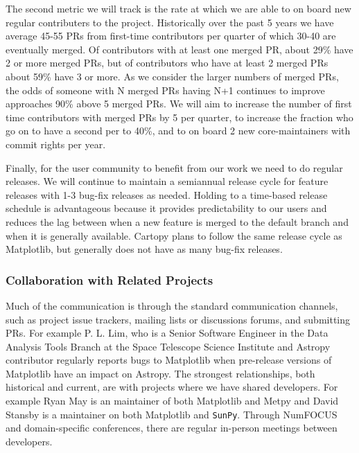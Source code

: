 \documentclass[12pt]{article}
\numberwithin{page}{section}
\begin{document}
The second metric we will track is the rate at which we are able to on board
new regular contributers to the project.  Historically over the past 5 years we
have average 45-55 PRs from first-time contributors per quarter of which 30-40
are eventually merged.  Of contributors with at least one merged PR, about 29\%
have 2 or more merged PRs, but of contributors who have at least 2 merged PRs
about 59\% have 3 or more.  As we consider the larger numbers of merged PRs,
the odds of someone with N merged PRs having N+1 continues to improve
approaches 90\% above 5 merged PRs.  We will aim to increase the number of
first time contributors with merged PRs by 5 per quarter, to increase the
fraction who go on to have a second per to 40\%, and to on board 2 new
core-maintainers with commit rights per year.

Finally, for the user community to benefit from our work we need to do
regular releases.  We will continue to maintain a semiannual release
cycle for feature releases with 1-3 bug-fix releases as needed.
Holding to a time-based release schedule is advantageous because it
provides predictability to our users and reduces the lag between when a
new feature is merged to the default branch and when it is generally
available. Cartopy plans to follow the same release cycle as Matplotlib, but
generally does not have as many bug-fix releases.

\subsubsection{Collaboration with Related Projects}


Much of the communication is through the standard communication channels, such
as project issue trackers, mailing lists or discussions forums, and submitting
PRs.  For example P. L. Lim, who is a Senior Software Engineer in the Data
Analysis Tools Branch at the Space Telescope Science Institute and Astropy
contributor regularly reports bugs to Matplotlib when pre-release versions of
Matplotlib have an impact on Astropy.  The strongest relationships, both
historical and current, are with projects where we have shared developers.
For example Ryan May is an maintainer of both Matplotlib and Metpy and David
Stansby is a maintainer on both Matplotlib and \texttt{SunPy}.  Through NumFOCUS
and domain-specific conferences, there are regular in-person meetings between
developers.
\end{document}
